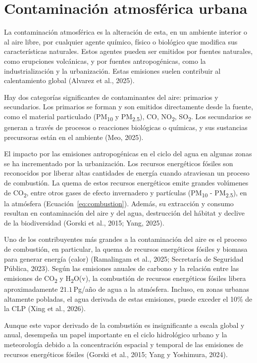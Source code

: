 \section{Contaminación atmosférica urbana}
La contaminación atmosférica es la alteración de esta, en un ambiente
interior o al aire libre, por cualquier agente químico, físico o
biológico que modifica sus características naturales. Estos agentes
pueden ser emitidos por fuentes naturales, como erupciones volcánicas,
y por fuentes antropogénicas, como la industrialización y la
urbanización. Estas emisiones suelen contribuir al calentamiento global
(Alvarez et al., 2025).

Hay dos categorías significantes de contaminantes del aire: 
primarios y secundarios. Los primarios se forman y son 
emitidos directamente desde la fuente, como el material particulado
(PM\textsubscript{10} y PM\textsubscript{2.5}), CO,
NO\textsubscript{2}, SO\textsubscript{2}. Los secundarios se generan a 
través de procesos o reacciones biológicas o químicas, y sus 
sustancias precursoras están en el ambiente (Meo, 2025). 

El impacto por las emisiones antropogénicas en el ciclo del agua en
algunas zonas se ha incrementado por la urbanización. Los recursos energéticos
fósiles son reconocidos por liberar altas cantidades de energía cuando
atraviesan un proceso de combustión. La quema de estos recursos energéticos
emite grandes volúmenes de CO\textsubscript{2}, entre otros gases de
efecto invernadero y partículas (PM\textsubscript{10} - PM\textsubscript{2.5}), 
en la atmósfera (Ecuación~\ref{eq:combustion}).
Además, su extracción y consumo resultan en contaminación del aire y
del agua, destrucción del hábitat y declive de la biodiversidad
(Gorski et al., 2015; Yang, 2025).

Uno de los contribuyentes más grandes a la contaminación del aire es el
proceso de combustión, en particular, la quema de recursos energéticos fósiles
y biomasa para generar energía (calor) (Ramalingam et al., 2025; 
Secretaría de Seguridad Pública, 2023).
Según las emisiones anuales de carbono y la relación entre las
emisiones de CO\textsubscript{2} y H\textsubscript{2}O(v), la
combustión de recursos energéticos fósiles libera aproximadamente
$21.1$\,Pg/año de agua a la atmósfera. Incluso, en zonas urbanas 
altamente pobladas, el agua derivada de estas emisiones, puede exceder
el 10\% de la CLP (Xing et al., 2026). 

Aunque este vapor derivado de la
combustión es insignificante a escala global y anual, desempeña un
papel importante en el ciclo hidrológico urbano y la meteorología
debido a la concentración espacial y temporal de las emisiones de
recursos energéticos fósiles (Gorski et al., 2015; Yang y Yoshimura, 2024).

